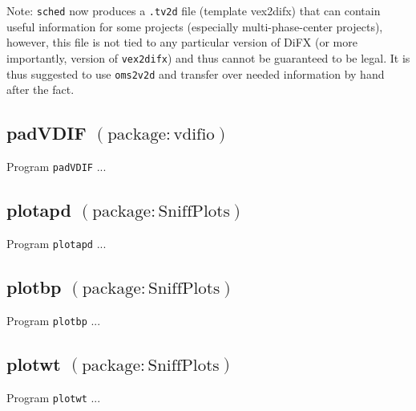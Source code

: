 \noindent
Note: {\tt sched} now produces a {\tt .tv2d} file (template vex2difx) that can contain useful information for some projects (especially multi-phase-center projects), however, this file is not tied to any particular version of DiFX (or more importantly, version of {\tt vex2difx}) and thus cannot be guaranteed to be legal.
It is thus suggested to use {\tt oms2v2d} and transfer over needed information by hand after the fact.








\subsection{padVDIF {\small $\mathrm{(package: vdifio)}$} \label{sec:padVDIF}}

Program {\tt padVDIF} ...




\subsection{plotapd {\small $\mathrm{(package: SniffPlots)}$} \label{sec:plotapd}}

Program {\tt plotapd} ...


\subsection{plotbp {\small $\mathrm{(package: SniffPlots)}$} \label{sec:plotbp}}

Program {\tt plotbp} ...


\subsection{plotwt {\small $\mathrm{(package: SniffPlots)}$} \label{sec:plotwt}}

Program {\tt plotwt} ...



